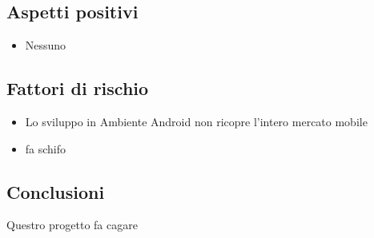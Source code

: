 \subsection{Aspetti positivi}
\begin{itemize}
    \item Nessuno
\end{itemize}
\subsection{Fattori di rischio}
\begin{itemize}
    \item Lo sviluppo in Ambiente Android non ricopre l'intero mercato mobile
    \item fa schifo
\end{itemize}
\subsection{Conclusioni}
Questro progetto fa cagare



